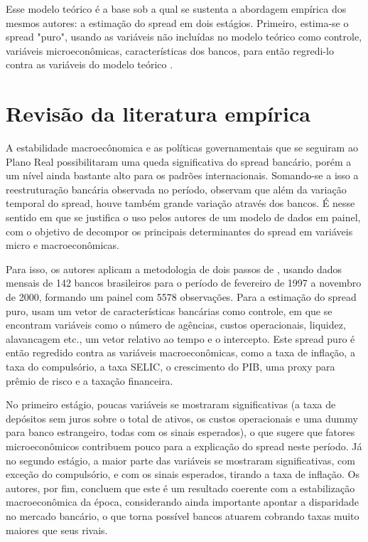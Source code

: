\documentclass[a4paper, 12pt, openany, oneside, brazil]{abntex2}
\begin{document}
    Esse modelo teórico é a base sob a qual se sustenta a abordagem empírica
    dos mesmos autores: a estimação do spread em dois estágios. Primeiro,
    estima-se o spread "puro", usando as variáveis não incluídas no modelo
    teórico como controle, variáveis microeconômicas, características dos
    bancos, para então regredi-lo contra as variáveis do modelo teórico
    .

\section{Revisão da literatura empírica}

    A estabilidade macroecônomica e as políticas governamentais que se seguiram
    ao Plano Real possibilitaram uma queda significativa do spread bancário,
    porém a um nível ainda bastante alto para os padrões internacionais.
    Somando-se a isso a reestruturação bancária observada no período,
     observam que além da variação temporal do spread,
    houve também grande variação através dos bancos. É nesse sentido em que se
    justifica o uso pelos autores de um modelo de dados em painel, com o
    objetivo de decompor os principais determinantes do spread em variáveis
    micro e macroeconômicas.

    Para isso, os autores aplicam a metodologia de dois passos de
    , usando dados mensais de 142 bancos brasileiros
    para o período de fevereiro de 1997 a novembro de 2000, formando um painel
    com 5578 observações. Para a estimação do spread puro, usam um vetor de
    características bancárias como controle, em que se encontram variáveis como
    o número de agências, custos operacionais, liquidez, alavancagem etc., um
    vetor relativo ao tempo e o intercepto. Este spread puro é então regredido
    contra as variáveis macroeconômicas, como a taxa de inflação, a taxa do
    compulsório, a taxa SELIC, o crescimento do PIB, uma proxy para prêmio de
    risco e a taxação financeira.
  
    No primeiro estágio, poucas variáveis se mostraram significativas (a taxa
    de depósitos sem juros sobre o total de ativos, os custos operacionais e
    uma dummy para banco estrangeiro, todas com os sinais esperados), o que
    sugere que fatores microeconômicos contribuem pouco para a explicação do
    spread neste período. Já no segundo estágio, a maior parte das variáveis se
    mostraram significativas, com exceção do compulsório, e com os sinais
    esperados, tirando a taxa de inflação. Os autores, por fim, concluem que
    este é um resultado coerente com a estabilização macroeconômica da época,
    considerando ainda importante apontar a disparidade no mercado bancário, o
    que torna possível bancos atuarem cobrando taxas muito maiores que seus
    rivais.




\end{document}
